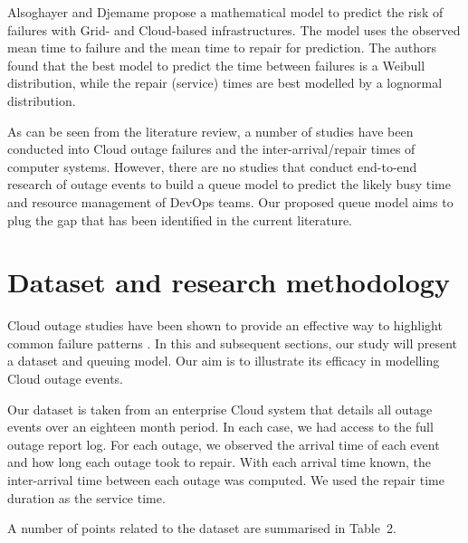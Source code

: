 \documentclass[5p]{elsarticle}
\begin{document}
Alsoghayer and Djemame \cite {alsoghayer2014resource} propose a mathematical model to predict the risk of failures with Grid- and Cloud-based infrastructures. The model uses the observed mean time to failure and the mean time to repair for prediction. The authors found that the best model to predict the time between failures is a Weibull distribution, while the repair (service) times are best modelled by a lognormal distribution.

As can be seen from the literature review, a number of studies have been conducted into Cloud outage failures and the inter-arrival/repair times of computer systems. However, there are no studies that conduct end-to-end research of outage events to build a queue model to predict the likely busy time and resource management of DevOps teams. Our proposed queue model aims to plug the gap that has been identified in the current literature.

\section{Dataset and research methodology}

Cloud outage studies have been shown to provide an effective way to highlight common failure patterns \cite{InfoWorld2015outage}. In this and subsequent sections, our study will present a dataset and queuing model. Our aim is to illustrate its efficacy in modelling Cloud outage events. 

Our dataset is taken from an enterprise Cloud system that details all outage events over an eighteen month period. In each case, we had access to the full outage report log. For each outage, we observed the arrival time of each event and how long each outage took to repair. With each arrival time known, the inter-arrival time between each outage was computed. We used the repair time duration as the service time.

A number of points related to the dataset are summarised in Table~2. 
\end{document}

